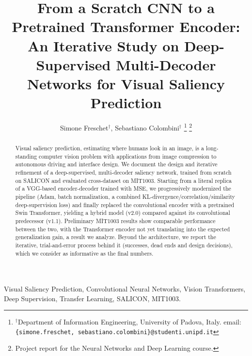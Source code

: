 \documentclass[10pt, conference, letterpaper]{IEEEtran}
\title{From a Scratch CNN to a Pretrained Transformer Encoder: \\
An Iterative Study on Deep-Supervised Multi-Decoder Networks for Visual Saliency Prediction}
\author{
Simone Freschet$^\dag$, Sebastiano Colombini$^\dag$
\thanks{$^\dag$Department of Information Engineering, University of Padova, Italy. \newline
email: \texttt{\{simone.freschet, sebastiano.colombini\}@studenti.unipd.it}}
\thanks{Project report for the Neural Networks and Deep Learning course.}
}
\begin{document}
\maketitle

\begin{abstract}
Visual saliency prediction, estimating where humans look in an image, is a long-standing computer vision problem with applications from image compression to autonomous driving and interface design.
We document the design and iterative refinement of a deep-supervised, multi-decoder saliency network, trained from scratch on SALICON and evaluated cross-dataset on MIT1003.
Starting from a literal replica of a VGG-based encoder-decoder trained with MSE, we progressively modernized the pipeline (Adam, batch normalization, a combined KL-divergence/correlation/similarity deep-supervision loss) and finally replaced the convolutional encoder with a pretrained Swin Transformer, yielding a hybrid model (v2.0) compared against its convolutional predecessor (v1.1).
Preliminary MIT1003 results show comparable performance between the two, with the Transformer encoder not yet translating into the expected generalization gain, a result we analyze.
Beyond the architecture, we report the iterative, trial-and-error process behind it (successes, dead ends and design decisions), which we consider as informative as the final numbers.
\end{abstract}

\IEEEkeywords
Visual Saliency Prediction, Convolutional Neural Networks, Vision Transformers, Deep Supervision, Transfer Learning, SALICON, MIT1003.
\endIEEEkeywords












\end{document}
